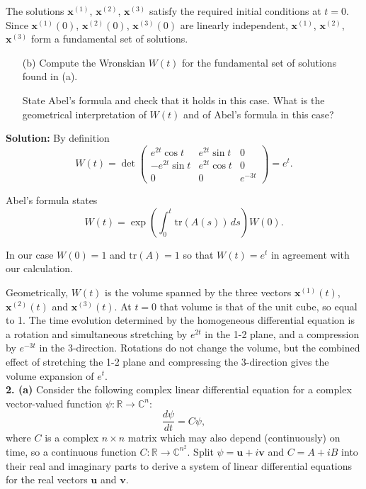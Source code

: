 \documentclass[10pt,landscape]{article}
\begin{document}
\begin{multicols}{2}
The solutions \(\mathbf{x}^{(1)}\), \(\mathbf{x}^{(2)}\), \(\mathbf{x}^{(3)}\) satisfy the required initial conditions at \(t = 0\). Since \(\mathbf{x}^{(1)}(0)\), \(\mathbf{x}^{(2)}(0)\), \(\mathbf{x}^{(3)}(0)\) are linearly independent, \(\mathbf{x}^{(1)}\), \(\mathbf{x}^{(2)}\), \(\mathbf{x}^{(3)}\) form a fundamental set of solutions.
\begin{enumerate}
    \item[(b)]  Compute the Wronskian \(W(t)\) for the fundamental set of solutions found in (a). 
    
    State Abel’s formula and check that it holds in this case. What is the geometrical interpretation of \(W(t)\) and of Abel’s formula in this case?
\end{enumerate}

\textbf{Solution:} By definition\\
\[
W(t) = \det
\begin{pmatrix}
e^{2t} \cos t & e^{2t} \sin t & 0 \\
-e^{2t} \sin t & e^{2t} \cos t & 0 \\
0 & 0 & e^{-3t}
\end{pmatrix}
= e^t.
\]


Abel’s formula states
\[
W(t) = \exp\left(
\int_{0}^{t}
\text{tr} (A(s)) \, ds\right) W(0).
\]


In our case \(W(0) = 1\) and \(\text{tr}(A) = 1\) so that \(W(t) = e^t\) in agreement with our calculation. 


Geometrically, \(W(t)\) is the volume spanned by the three vectors \(\mathbf{x}^{(1)}(t)\), \(\mathbf{x}^{(2)}(t)\) and \(\mathbf{x}^{(3)}(t)\). At \(t = 0\) that volume is that of the unit cube, so equal to 1. The time evolution determined by the homogeneous differential equation is a rotation and simultaneous stretching by \(e^{2t}\) in the 1-2 plane, and a compression by \(e^{-3t}\) in the 3-direction. Rotations do not change the volume, but the combined effect of stretching the 1-2 plane and compressing the 3-direction gives the volume expansion of \(e^t\). \\

\bigskip
\bigskip
\bigskip
\textbf{2. (a)}  Consider the following complex linear differential equation for a complex vector-valued function \(\psi : \mathbb{R} \to \mathbb{C}^n\):\\
\[
\frac{d\psi}{dt} = C\psi, \tag{1}
\]
where \(C\) is a complex \(n \times n\) matrix which may also depend (continuously) on time, so a continuous function \(C : \mathbb{R} \to \mathbb{C}^{n^2}\). Split \(\psi = \mathbf{u} + i\mathbf{v}\) and \(C = A + iB\) into their real and imaginary parts to derive a system of linear differential equations for the real vectors \(\mathbf{u}\) and \(\mathbf{v}\). 


\end{multicols}
\end{document}
